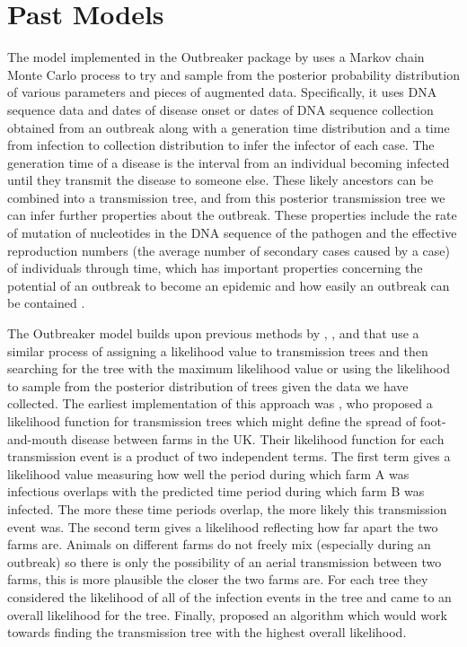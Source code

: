 \documentclass[11pt,a4paper]{report}
\begin{document}
\section{Past Models}
The model implemented in the Outbreaker package by \citet{outbrkr} uses a Markov chain Monte Carlo process to try and sample from the posterior probability distribution of various parameters and pieces of augmented data. Specifically, it uses DNA sequence data and dates of disease onset or dates of DNA sequence collection obtained from an outbreak along with a generation time distribution and a time from infection to collection distribution to infer the infector of each case. The generation time of a disease is the interval from an individual becoming infected until they transmit the disease to someone else. These likely ancestors can be combined into a transmission tree, and from this posterior transmission tree we can infer further properties about the outbreak. These properties include the rate of mutation of nucleotides in the DNA sequence of the pathogen and the effective reproduction numbers (the average number of secondary cases caused by a case) of individuals through time, which has important properties concerning the potential of an outbreak to become an epidemic \citep{Grassly08} and how easily an outbreak can be contained \citep{Wallinga04}.

The Outbreaker model builds upon previous methods by \citet{Haydon03}, \citet{Cottam08},\citet{Morelli12} and \citet{Ypma13} that use a similar process of assigning a likelihood value to transmission trees and then searching for the tree with the maximum likelihood value or using the likelihood to sample from the posterior distribution of trees given the data we have collected. The earliest implementation of this approach was \citet{Haydon03}, who proposed a likelihood function for transmission trees which might define the spread of foot-and-mouth disease between farms in the UK. Their likelihood function for each transmission event is a product of two independent terms. The first term gives a likelihood value measuring how well the period during which farm A was infectious overlaps with the predicted time period during which farm B was infected. The more these time periods overlap, the more likely this transmission event was. The second term gives a likelihood reflecting how far apart the two farms are. Animals on different farms do not freely mix (especially during an outbreak) so there is only the possibility of an aerial transmission between two farms, this is more plausible the closer the two farms are. For each tree they considered the likelihood of all of the infection events in the tree and came to an overall likelihood for the tree. Finally, \citet{Haydon03} proposed an algorithm which would work towards finding the transmission tree with the highest overall likelihood.
\end{document}
